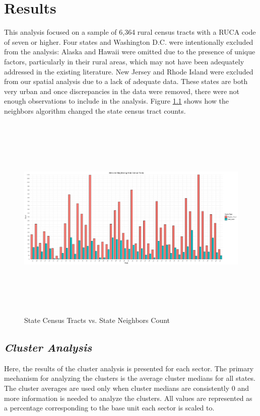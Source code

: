 \chapter{Results}	

This analysis focused on a sample of 6,364 rural census tracts with a RUCA code of seven or higher. Four states and Washington D.C. were intentionally excluded from the analysis: Alaska and Hawaii were omitted  due to the presence of unique factors, particularly in their rural areas, which may not have been adequately addressed in the existing literature.  New Jersey and Rhode Island were excluded from our spatial analysis due to a lack of adequate data. These states are both very urban and once discrepancies in the data were removed, there were not enough observations to include in the analysis.  Figure \ref{fig:neighbors_bar} shows how the neighbors algorithm changed the state census tract counts. 

\begin{figure}[htbp]
    \centering
    \includegraphics[width=1\textwidth, height=10cm]{plots/neighbors.jpeg}
    \caption{State Census Tracts vs. State Neighbors Count}
    \label{fig:neighbors_bar}
\end{figure}


\section{\textit{Cluster Analysis}}

Here, the results of the cluster analysis is presented for each sector. The primary mechanism for analyzing the clusters is the average cluster medians for all states. The cluster averages are used only when cluster medians are consistently 0 and more information is needed to analyze the clusters.  All values are represented as a percentage corresponding to the base unit each sector is scaled to. 

